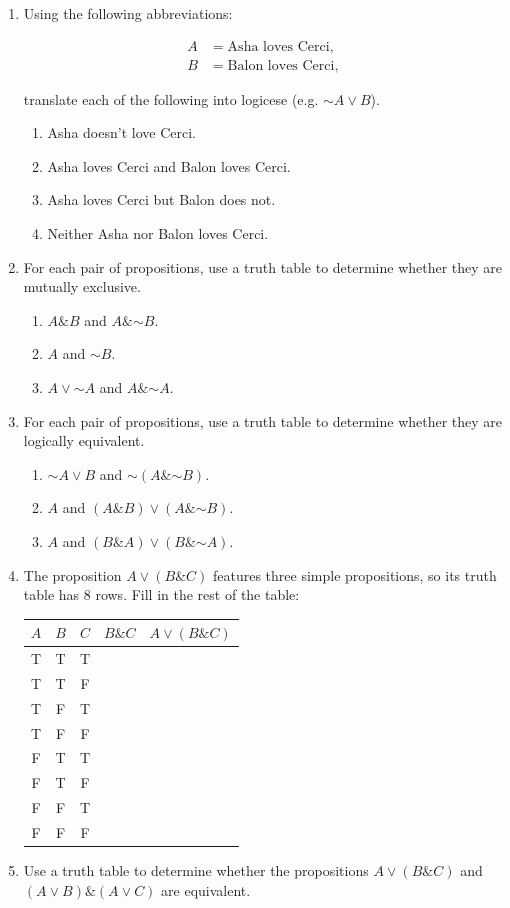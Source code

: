 \documentclass[justified]{tufte-book}
\providecommand{\tightlist}{%
  \setlength{\itemsep}{0pt}\setlength{\parskip}{0pt}}
\renewcommand{\neg}{\mathbin{\sim}}
\renewcommand{\wedge}{\mathbin{\&}}
\theoremstyle{definition}
\theoremstyle{definition}
\theoremstyle{definition}
\theoremstyle{remark}
\begin{document}
\begin{enumerate}
\item
  Using the following abbreviations:

  \[
    \begin{aligned}
       A &= \mbox{Asha loves Cerci},\\
       B &= \mbox{Balon loves Cerci},
    \end{aligned}
  \]

  translate each of the following into logicese (e.g. \(\neg A \vee B\)).

  \begin{enumerate}
  \def\labelenumii{\alph{enumii}.}
  \tightlist
  \item
    Asha doesn't love Cerci.
  \item
    Asha loves Cerci and Balon loves Cerci.
  \item
    Asha loves Cerci but Balon does not.
  \item
    Neither Asha nor Balon loves Cerci.
  \end{enumerate}
\item
  For each pair of propositions, use a truth table to determine whether they are mutually exclusive.

  \begin{enumerate}
  \def\labelenumii{\alph{enumii}.}
  \tightlist
  \item
    \(A \wedge B\) and \(A \wedge \neg B\).
  \item
    \(A\) and \(\neg B\).
  \item
    \(A \vee \neg A\) and \(A \wedge \neg A\).
  \end{enumerate}
\item
  For each pair of propositions, use a truth table to determine whether they are logically equivalent.

  \begin{enumerate}
  \def\labelenumii{\alph{enumii}.}
  \tightlist
  \item
    \(\neg A \vee B\) and \(\neg (A \wedge \neg B)\).
  \item
    \(A\) and \((A \wedge B) \vee (A \wedge \neg B)\).
  \item
    \(A\) and \((B \wedge A) \vee (B \wedge \neg A)\).
  \end{enumerate}
\item
  The proposition \(A \vee (B \wedge C)\) features three simple propositions, so its truth table has 8 rows. Fill in the rest of the table:

  \begin{longtable}[]{@{}ccccc@{}}
  \toprule
  \(A\) & \(B\) & \(C\) & \(B \wedge C\) & \(A \vee (B \wedge C)\)\tabularnewline
  \midrule
  \endhead
  T & T & T & &\tabularnewline
  T & T & F & &\tabularnewline
  T & F & T & &\tabularnewline
  T & F & F & &\tabularnewline
  F & T & T & &\tabularnewline
  F & T & F & &\tabularnewline
  F & F & T & &\tabularnewline
  F & F & F & &\tabularnewline
  \bottomrule
  \end{longtable}
\item
  Use a truth table to determine whether the propositions \(A \vee (B \wedge C)\) and \((A \vee B) \wedge (A \vee C)\) are equivalent.
\end{enumerate}
\end{document}
